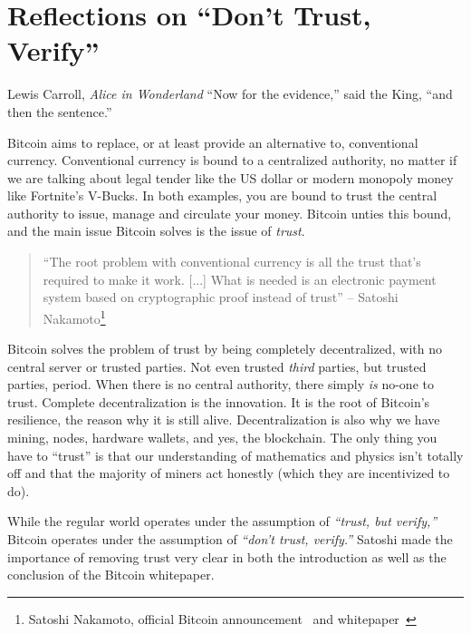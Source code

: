 \chapter{Reflections on ``Don't Trust, Verify''}
\label{les:16}

\begin{chapquote}{Lewis Carroll, \textit{Alice in Wonderland}}
``Now for the evidence,'' said the King, ``and then the sentence.''
\end{chapquote}

Bitcoin aims to replace, or at least provide an alternative to,
conventional currency. Conventional currency is bound to a centralized
authority, no matter if we are talking about legal tender like the US
dollar or modern monopoly money like Fortnite's V-Bucks. In both
examples, you are bound to trust the central authority to issue, manage
and circulate your money. Bitcoin unties this bound, and the main issue
Bitcoin solves is the issue of \textit{trust}.

\begin{quotation}
``The root problem with conventional currency is all the trust that's
required to make it work. [...] What is needed is an electronic
payment system based on cryptographic proof instead of trust''
\flushright -- Satoshi Nakamoto\footnote{Satoshi Nakamoto, official Bitcoin announcement~\cite{bitcoin-announcement} and whitepaper~\cite{whitepaper}}
\end{quotation}

Bitcoin solves the problem of trust by being completely decentralized,
with no central server or trusted parties. Not even trusted \textit{third}
parties, but trusted parties, period. When there is no central
authority, there simply \textit{is} no-one to trust. Complete decentralization
is the innovation. It is the root of Bitcoin's resilience, the reason
why it is still alive. Decentralization is also why we have mining,
nodes, hardware wallets, and yes, the blockchain. The only thing you
have to \enquote{trust} is that our understanding of mathematics and physics
isn't totally off and that the majority of miners act honestly (which
they are incentivized to do).

While the regular world operates under the assumption of \textit{\enquote{trust,
but verify,}} Bitcoin operates under the assumption of \textit{\enquote{don't
trust, verify.}} Satoshi made the importance of removing trust very clear in
both the introduction as well as the conclusion of the Bitcoin whitepaper.

